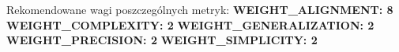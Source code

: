 Rekomendowane wagi poszczególnych metryk: \newline
\textbf{WEIGHT\_ALIGNMENT:              8} \newline
\textbf{WEIGHT\_COMPLEXITY:              2} \newline
\textbf{WEIGHT\_GENERALIZATION:          2} \newline
\textbf{WEIGHT\_PRECISION:               2} \newline
\textbf{WEIGHT\_SIMPLICITY:              2} \newline
